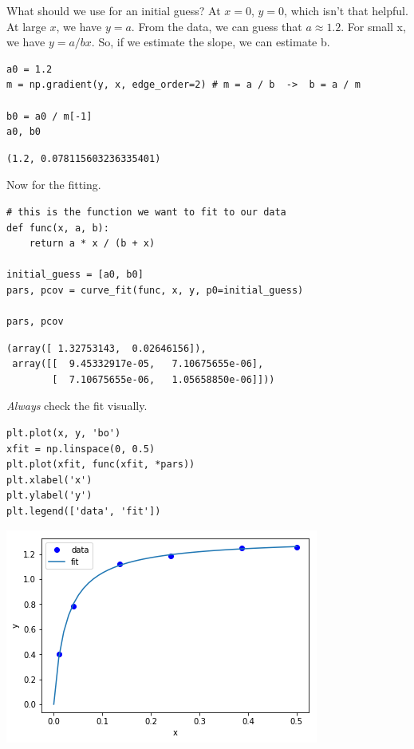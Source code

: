 \documentclass[11pt]{article}
\begin{document}
What should we use for an initial guess? At \(x=0\), \(y = 0\), which isn't that helpful. At large \(x\), we have \(y=a\). From the data, we can guess that \(a \approx 1.2\). For small x, we have \(y = a/b x\). So, if we estimate the slope, we can estimate b.

\begin{verbatim}
a0 = 1.2
m = np.gradient(y, x, edge_order=2) # m = a / b  ->  b = a / m

b0 = a0 / m[-1]
a0, b0
\end{verbatim}

\begin{verbatim}
(1.2, 0.078115603236335401)
\end{verbatim}

Now for the fitting.

\begin{verbatim}
# this is the function we want to fit to our data
def func(x, a, b):
    return a * x / (b + x)

initial_guess = [a0, b0]
pars, pcov = curve_fit(func, x, y, p0=initial_guess)

pars, pcov
\end{verbatim}

\begin{verbatim}
(array([ 1.32753143,  0.02646156]),
 array([[  9.45332917e-05,   7.10675655e-06],
        [  7.10675655e-06,   1.05658850e-06]]))
\end{verbatim}

\emph{Always} check the fit visually.

\begin{verbatim}
plt.plot(x, y, 'bo')
xfit = np.linspace(0, 0.5)
plt.plot(xfit, func(xfit, *pars))
plt.xlabel('x')
plt.ylabel('y')
plt.legend(['data', 'fit'])
\end{verbatim}

\begin{center}
\includegraphics[width=.9\linewidth]{obipy-resources/513154bd4a2746455cb8d249e9b62785-92704yrN.png}
\end{center}
\end{document}
